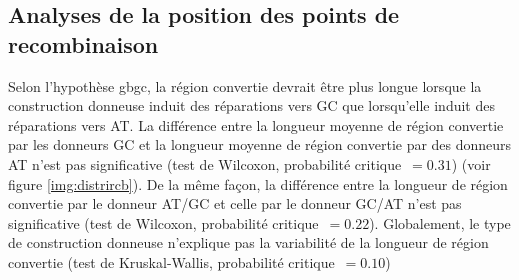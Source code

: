 \subsection{Analyses de la position des points de recombinaison}

Selon l'hypothèse \ac{gbgc}, la région convertie devrait être plus longue
lorsque la construction donneuse induit des réparations vers GC que lorsqu'elle
induit des réparations vers AT. La différence entre la longueur moyenne de
région convertie par les donneurs GC et la longueur moyenne de région convertie
par des donneurs AT n'est pas significative (test de Wilcoxon, probabilité
critique~\(= 0.31\)) (voir figure \ref{img:distrircb}). De la même façon, la
différence entre la longueur de région convertie par le donneur AT/GC et celle
par le donneur GC/AT n'est pas significative (test de Wilcoxon, probabilité
critique~\(= 0.22\)). Globalement, le type de construction donneuse n'explique
pas la variabilité de la longueur de région convertie (test de Kruskal-Wallis,
probabilité critique~\(=0.10\))


